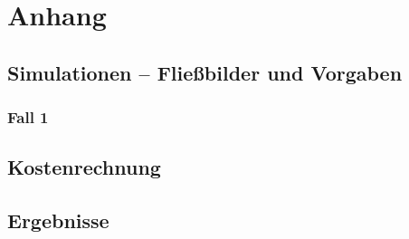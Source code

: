 \part*{Anhang}

\chapter{Simulationen -- Fließbilder und Vorgaben}
\label{ch:a_sim}

\section{Fall 1}


\chapter{Kostenrechnung}
\label{ch:a_kosten}


\chapter{Ergebnisse}
\label{ch:a_erg}